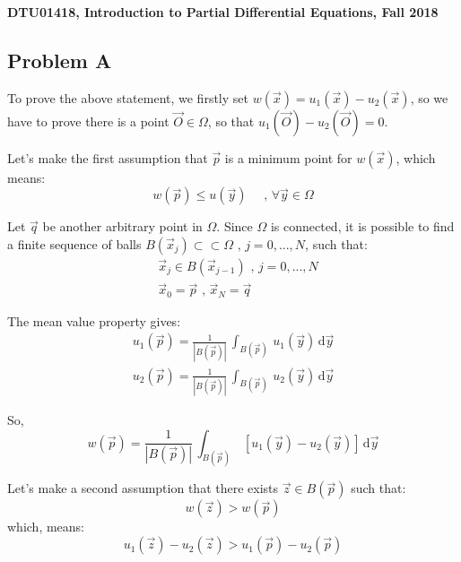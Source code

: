 \documentclass[../main.tex]{subfiles}
\begin{document}
\textbf{DTU01418, Introduction to Partial Differential Equations, Fall 2018}

\subsection{Problem A}

To prove the above statement, we firstly set $w(\vec{x}) = u_1(\vec{x}) - u_2(\vec{x})$, so we have to prove there is a point $\vec{O} \in \Omega$, so that $u_1(\vec{O}) - u_2(\vec{O}) = 0$.

Let's make the first assumption that $\vec{p}$ is a minimum point for $w(\vec{x})$, which means:
\begin{equation}
    w(\vec{p}) \leqslant u(\vec{y}) \quad \text{ ,  } \forall \vec{y} \in \Omega
\end{equation}

Let $\vec{q}$ be another arbitrary point in $\Omega$. Since $\Omega$ is connected, it is possible to find a finite sequence of balls $B(\vec{x}_j) \subset \subset \Omega \text{ ,  } j = 0,...,N$, such that:
\begin{align}
    & \vec{x}_j \in B(\vec{x}_{j-1}) \text{ ,  } j = 0,...,N \\
    & \vec{x}_0 = \vec{p} \text{ ,  } \vec{x}_N = \vec{q}
\end{align}

The mean value property gives:
\begin{align}
    u_1(\vec{p}) = \frac{1}{|B(\vec{p})|} \, \int_{B(\vec{p})} \, u_1(\vec{y}) \, \mathrm{d} \vec{y} \\
    u_2(\vec{p}) = \frac{1}{|B(\vec{p})|} \, \int_{B(\vec{p})} \, u_2(\vec{y}) \, \mathrm{d} \vec{y}
\end{align}

So,
\begin{equation}
    w(\vec{p}) = \frac{1}{|B(\vec{p})|} \, \int_{B(\vec{p})} \, [u_1(\vec{y}) - u_2(\vec{y})] \, \mathrm{d} \vec{y}
\end{equation}

Let's make a second assumption that there exists $\vec{z} \in B(\vec{p})$ such that:
\begin{equation}
    w(\vec{z}) > w(\vec{p})
\end{equation}
which, means:
\begin{equation}
    u_1(\vec{z}) - u_2(\vec{z}) > u_1(\vec{p}) - u_2(\vec{p})
\end{equation}
\end{document}
